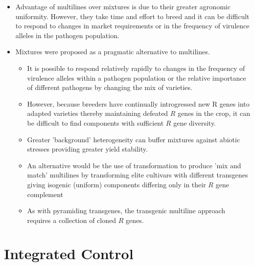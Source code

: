 \documentclass[11pt,dvipsnames,ignorenonframetext,aspectratio=169]{beamer}
\providecommand{\tightlist}{%
  \setlength{\itemsep}{0pt}\setlength{\parskip}{0pt}}
\begin{document}
\begin{frame}{}
\protect\hypertarget{section-9}{}
\small

\begin{itemize}
\tightlist
\item
  Advantage of multilines over mixtures is due to their greater
  agronomic uniformity. However, they take time and effort to breed and
  it can be difficult to respond to changes in market requirements or in
  the frequency of virulence alleles in the pathogen population.
\item
  Mixtures were proposed as a pragmatic alternative to multilines.

  \begin{itemize}
  \footnotesize
  \item It is possible to respond relatively rapidly to changes in the frequency of virulence alleles within a pathogen population or the relative importance of different pathogens by changing the mix of varieties.
  \item However, because breeders have continually introgressed new R genes into adapted varieties thereby maintaining defeated $R$ genes in the crop, it can be difficult to find components with sufficient $R$ gene diversity.
  \item Greater 'background' heterogeneity can buffer mixtures against abiotic stresses providing greater yield stability.
  \item An alternative would be the use of transformation to produce 'mix and match' multilines by transforming elite cultivars with different transgenes giving isogenic (uniform) components differing only in their $R$ gene complement
  \item As with pyramiding transgenes, the transgenic multiline approach requires a collection of cloned $R$ genes.
  \end{itemize}
\end{itemize}
\end{frame}

\hypertarget{integrated-control}{%
\section{Integrated Control}\label{integrated-control}}
\end{document}
